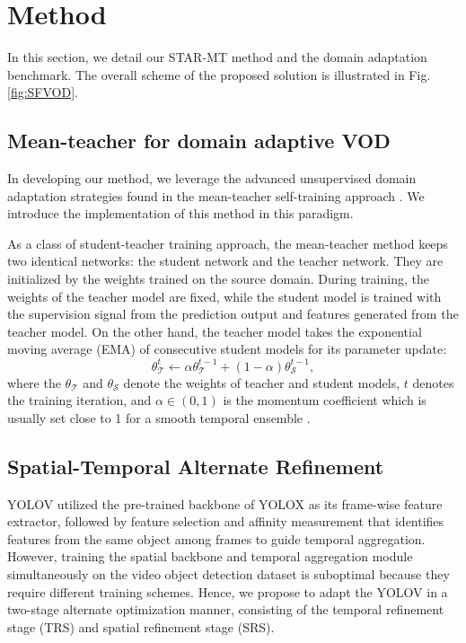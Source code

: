 \section{Method}

In this section, we detail our STAR-MT method and the domain adaptation benchmark. The overall scheme of the proposed solution is illustrated in Fig.\ref{fig:SFVOD}. 

\subsection{Mean-teacher for domain adaptive VOD}
 In developing our method, we leverage the advanced unsupervised domain adaptation strategies found in the mean-teacher self-training approach \cite{tarvainen2017mean}. We introduce the implementation of this method in this paradigm.
 
 As a class of student-teacher training approach, the mean-teacher method keeps two identical networks: the student network and the teacher network. They are initialized by the weights trained on the source domain. During training, the weights of the teacher model are fixed, while the student model is trained with the supervision signal from the prediction output and features generated from the teacher model. On the other hand, the teacher model takes the exponential moving average (EMA) of consecutive student models for its parameter update:
\begin{equation}
    \theta_{\mathcal{T}}^{t} \leftarrow \alpha \theta_{\mathcal{T}}^{t-1} + (1-\alpha) \theta_{\mathcal{S}}^{t-1},
\end{equation}
where the $\theta_{\mathcal{T}}$ and $\theta_{\mathcal{S}}$ denote the weights of teacher and student models, $t$ denotes the training iteration, and $\alpha \in (0,1)$ is the momentum coefficient which is usually set close to 1 for a smooth temporal ensemble \cite{cao2023contrastive}.
 
\subsection{Spatial-Temporal Alternate Refinement}
YOLOV utilized the pre-trained backbone of YOLOX as its frame-wise feature extractor, followed by feature selection and affinity measurement that identifies features from the same object among frames to guide temporal aggregation. However, training the spatial backbone and temporal aggregation module simultaneously on the video object detection dataset is suboptimal because they require different training schemes. Hence, we propose to adapt the YOLOV in a two-stage alternate optimization manner, consisting of the temporal refinement stage (TRS) and spatial refinement stage (SRS).

